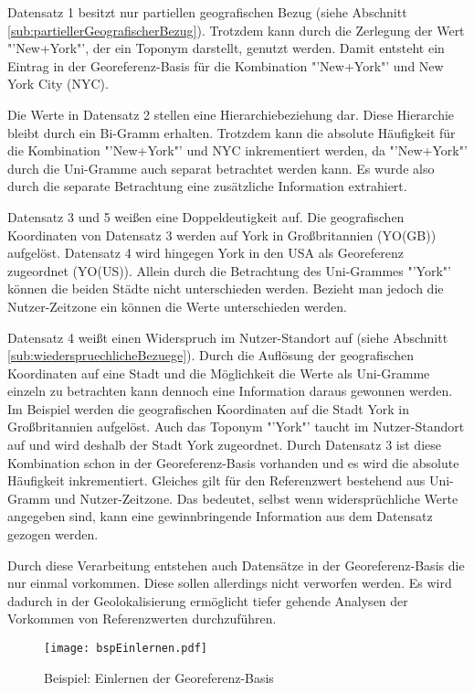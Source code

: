 			Datensatz 1 besitzt nur partiellen geografischen Bezug (siehe Abschnitt \ref{sub:partiellerGeografischerBezug}). 
			Trotzdem kann durch die Zerlegung der Wert "'New+York"', der ein Toponym darstellt, genutzt werden.
			Damit entsteht ein Eintrag in der Georeferenz-Basis für die Kombination "'New+York"' und New York City (NYC).

			Die Werte in Datensatz 2 stellen eine Hierarchiebeziehung dar.
			Diese Hierarchie bleibt durch ein Bi-Gramm erhalten.
			Trotzdem kann die absolute Häufigkeit für die Kombination "'New+York"' und NYC inkrementiert werden, da "'New+York"' durch die Uni-Gramme auch separat betrachtet werden kann.
			Es wurde also durch die separate Betrachtung eine zusätzliche Information extrahiert.

			Datensatz 3 und 5 weißen eine Doppeldeutigkeit auf.
			Die geografischen Koordinaten von Datensatz 3 werden auf York in Großbritannien (YO(GB)) aufgelöst.
			Datensatz 4 wird hingegen York in den USA als Georeferenz zugeordnet (YO(US)). 
			Allein durch die Betrachtung des Uni-Grammes "'York"' können die beiden Städte nicht unterschieden werden. 
			Bezieht man jedoch die Nutzer-Zeitzone ein können die Werte unterschieden werden. 

			Datensatz 4 weißt einen Widerspruch im Nutzer-Standort auf (siehe Abschnitt \ref{sub:wiederspruechlicheBezuege}). 
			Durch die Auflösung der geografischen Koordinaten auf eine Stadt und die Möglichkeit die Werte als Uni-Gramme einzeln zu betrachten kann dennoch eine Information daraus gewonnen werden. 
			Im Beispiel werden die geografischen Koordinaten auf die Stadt York in Großbritannien aufgelöst.
			Auch das Toponym "'York"' taucht im Nutzer-Standort auf und wird deshalb der Stadt York zugeordnet.  
			Durch Datensatz 3 ist diese Kombination schon in der Georeferenz-Basis vorhanden und es wird die absolute Häufigkeit inkrementiert.
			Gleiches gilt für den Referenzwert bestehend aus Uni-Gramm und Nutzer-Zeitzone.
			Das bedeutet, selbst wenn widersprüchliche Werte angegeben sind, kann eine gewinnbringende Information aus dem Datensatz gezogen werden.

			Durch diese Verarbeitung entstehen auch Datensätze in der Georeferenz-Basis die nur einmal vorkommen.
			Diese sollen allerdings nicht verworfen werden. 
			Es wird dadurch in der Geolokalisierung ermöglicht tiefer gehende Analysen der Vorkommen von Referenzwerten durchzuführen. 

			\begin{figure}[h!]
				\begin{center}
				\texttt{[image: bspEinlernen.pdf]}
				\caption{Beispiel: Einlernen der Georeferenz-Basis}
				\label{img:bspEinlernen}
				\end{center}
			\end{figure}	
				

